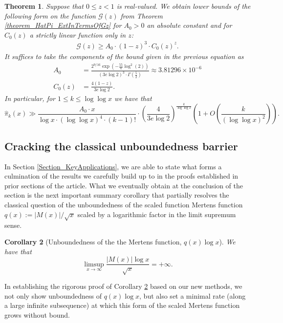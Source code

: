 \documentclass[11pt,reqno,a4letter]{article}
\numberwithin{figure}{section}
\numberwithin{table}{section}
\theoremstyle{plain}
\newtheorem{theorem}{Theorem}
\newtheorem{cor}[theorem]{Corollary}
\numberwithin{theorem}{section}
\theoremstyle{definition}
\newcommand{\SuccSim}[0]{\overset{_{\scriptsize{\blacktriangle}}}{\succsim}}
\renewcommand{\SuccSim}[0]{\ensuremath{\gg}}
\begin{document}
\begin{theorem} 
\label{theorem_GFs_SymmFuncs_SumsOfRecipOfPowsOfPrimes} 
\label{cor_BoundsOnGz_FromMVBook_initial_stmt_v1} 
Suppose that $0 \leq z < 1$ is real-valued. 
We obtain lower bounds of the following form on the function 
$\mathcal{G}(z)$ from Theorem \ref{theorem_HatPi_ExtInTermsOfGz} 
for $A_0 > 0$ an absolute constant and for 
$C_0(z)$ a strictly linear function only in $z$: 
\begin{align*} 
\mathcal{G}(z) \geq A_0 \cdot (1-z)^{3} \cdot C_0(z)^{z}. 
\end{align*} 
It suffices to take the components of the bound given in the previous equation as 
\begin{align*}
A_0 & = \frac{2^{9/16} \exp\left(-\frac{55}{4} \log^2(2)\right)}{ 
     (3e\log 2)^3 \cdot \Gamma\left(\frac{5}{2}\right)} \approx 3.81296 \times 10^{-6} \\ 
C_0(z) & = \frac{4(1-z)}{3e \log 2}. 
\end{align*} 
In particular, for $1 \leq k \leq \log\log x$ we have that 
\[
\widehat{\pi}_k(x) \SuccSim \frac{A_0 \cdot x}{\log x \cdot (\log\log x)^4 \cdot (k-1)!} \cdot 
     \left(\frac{4}{3e\log 2}\right)^{\frac{k}{\log\log x}} \left( 
     1 + O\left(\frac{k}{(\log\log x)^2}\right) 
     \right).
\]
\end{theorem} 

\subsection{Cracking the classical unboundedness barrier} 

In Section \ref{Section_KeyApplications}, 
we are able to state what forms a culmination of the results 
we carefully build up to in the proofs established in prior sections of the article. 
What we eventually obtain at the conclusion of the section 
is the next important summary corollary that partially 
resolves the classical question of the 
unboundedness of the scaled function Mertens function 
$q(x) := |M(x)| / \sqrt{x}$ scaled by a logarithmic factor 
in the limit supremum sense. 

\begin{cor}[Unboundedness of the the Mertens function, $q(x) \log x$] 
\label{cor_ThePipeDreamResult_v1} 
We have that 
\[
\limsup_{x \rightarrow \infty} \frac{|M(x)| \log x}{\sqrt{x}} = +\infty. 
\]
\end{cor} 

In establishing the rigorous proof of 
Corollary \ref{cor_ThePipeDreamResult_v1} 
based on our new methods, we not only show unboundedness of 
$q(x) \log x$, but also set a minimal rate (along a large infinite subsequence) 
at which this form of the 
scaled Mertens function grows without bound. 
\end{document}
